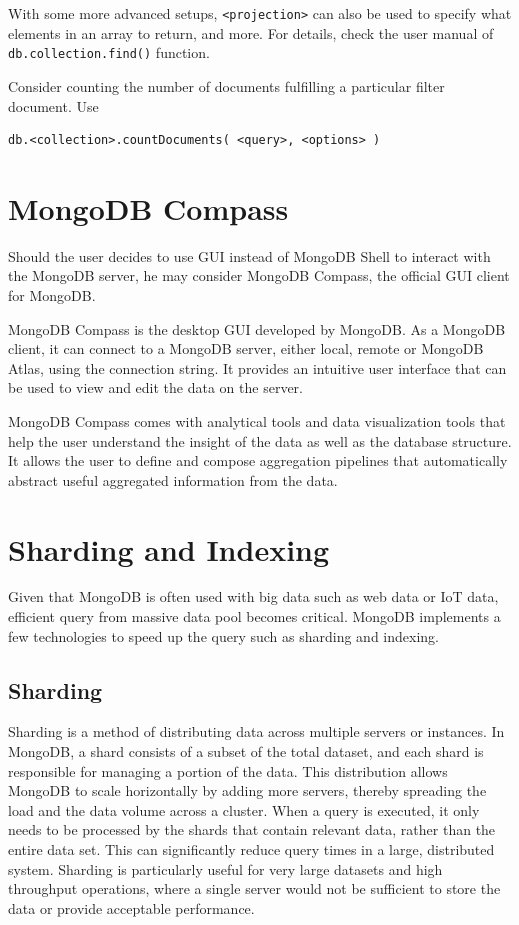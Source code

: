 With some more advanced setups, \verb|<projection>| can also be used to specify what elements in an array to return, and more. For details, check the user manual of \verb|db.collection.find()| function.

Consider counting the number of documents fulfilling a particular filter document. Use
\begin{lstlisting}
db.<collection>.countDocuments( <query>, <options> )
\end{lstlisting}

\section{MongoDB Compass}

Should the user decides to use GUI instead of MongoDB Shell to interact with the MongoDB server, he may consider MongoDB Compass, the official GUI client for MongoDB.

MongoDB Compass is the desktop GUI developed by MongoDB. As a MongoDB client, it can connect to a MongoDB server, either local, remote or MongoDB Atlas, using the connection string. It provides an intuitive user interface that can be used to view and edit the data on the server. 

MongoDB Compass comes with analytical tools and data visualization tools that help the user understand the insight of the data as well as the database structure. It allows the user to define and compose aggregation pipelines that automatically abstract useful aggregated information from the data.

\section{Sharding and Indexing}

Given that MongoDB is often used with big data such as web data or IoT data, efficient query from massive data pool becomes critical. MongoDB implements a few technologies to speed up the query such as sharding and indexing.

\subsection{Sharding}

Sharding is a method of distributing data across multiple servers or instances. In MongoDB, a shard consists of a subset of the total dataset, and each shard is responsible for managing a portion of the data. This distribution allows MongoDB to scale horizontally by adding more servers, thereby spreading the load and the data volume across a cluster. When a query is executed, it only needs to be processed by the shards that contain relevant data, rather than the entire data set. This can significantly reduce query times in a large, distributed system. Sharding is particularly useful for very large datasets and high throughput operations, where a single server would not be sufficient to store the data or provide acceptable performance.

